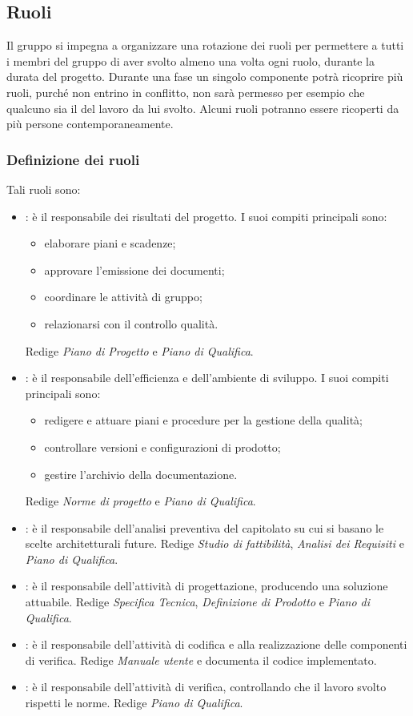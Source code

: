 \subsection{Ruoli}
Il gruppo \GroupName{} si impegna a organizzare una rotazione dei ruoli per permettere a tutti i membri del gruppo di aver svolto almeno una volta ogni ruolo, durante la durata del progetto. Durante una fase un singolo componente potrà ricoprire più ruoli, purché non entrino in conflitto, non sarà permesso per esempio che qualcuno sia il \Verificatore{} del lavoro da lui svolto. Alcuni ruoli potranno essere ricoperti da più persone contemporaneamente.
\subsubsection{Definizione dei ruoli}
Tali ruoli sono:
\begin{itemize}
	\item \Responsabile: è il responsabile dei risultati del progetto. I suoi compiti principali sono:
	\begin{itemize}
		\item elaborare piani e scadenze;
		\item approvare l'emissione dei documenti;
		\item coordinare le attività di gruppo;
		\item relazionarsi con il controllo qualità.
	\end{itemize}
	Redige \textit{Piano di Progetto} e \textit{Piano di Qualifica}.
	\item \Amministratore: è il responsabile dell'efficienza e dell'ambiente di sviluppo. I suoi compiti principali sono:
	\begin{itemize}
		\item redigere e attuare piani e procedure per la gestione della qualità;
		\item controllare versioni e configurazioni di prodotto;
		\item gestire l'archivio della documentazione.
	\end{itemize}
	Redige \textit{Norme di progetto} e \textit{Piano di Qualifica}.
	\item \Analista: è il responsabile dell'analisi preventiva del capitolato su cui si basano le scelte architetturali future.
	Redige \textit{Studio di fattibilità}, \textit{Analisi dei Requisiti} e \textit{Piano di Qualifica}.
	\item \Progettista: è il responsabile dell'attività di progettazione, producendo una soluzione attuabile.
	Redige \textit{Specifica Tecnica}, \textit{Definizione di Prodotto} e \textit{Piano di Qualifica}.
	\item \Programmatore: è il responsabile dell'attività di codifica e alla realizzazione delle componenti di verifica.
	Redige \textit{Manuale utente} e documenta il codice implementato.
	\item \Verificatore: è il responsabile dell'attività di verifica, controllando che il lavoro svolto rispetti le norme.
	Redige \textit{Piano di Qualifica}.
\end{itemize}
